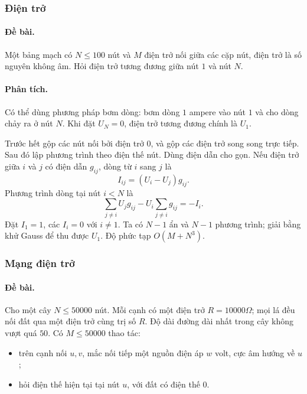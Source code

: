 \documentclass[11pt]{article}
\begin{document}
\subsubsection{Điện trở}

\paragraph{Đề bài.}
Một bảng mạch có \(N\le 100\) nút và \(M\) điện trở nối giữa các cặp nút, điện
trở là số nguyên không âm. Hỏi điện trở tương đương giữa nút \(1\) và nút \(N\).

\paragraph{Phân tích.}
Có thể dùng phương pháp bơm dòng: bơm dòng \(1\) ampere vào nút \(1\) và cho
dòng chảy ra ở nút \(N\). Khi đặt \(U_N=0\), điện trở tương đương chính là
\(U_1\).

Trước hết gộp các nút nối bởi điện trở \(0\), và gộp các điện trở song song
trực tiếp. Sau đó lập phương trình theo điện thế nút. Dùng điện dẫn cho gọn.
Nếu điện trở giữa \(i\) và \(j\) có điện dẫn \(g_{ij}\), dòng từ \(i\) sang
\(j\) là
\[
  I_{ij}=(U_i-U_j)g_{ij}.
\]
Phương trình dòng tại nút \(i<N\) là
\[
  \sum_{j\ne i} U_jg_{ij}-U_i\sum_{j\ne i}g_{ij}=-I_i.
\]
Đặt \(I_1=1\), các \(I_i=0\) với \(i\ne 1\). Ta có \(N-1\) ẩn và \(N-1\)
phương trình; giải bằng khử Gauss để thu được \(U_1\). Độ phức tạp
\(O(M+N^3)\).

\subsubsection{Mạng điện trở}

\paragraph{Đề bài.}
Cho một cây \(N\le 50000\) nút. Mỗi cạnh có một điện trở \(R=10000\Omega\);
mọi lá đều nối đất qua một điện trở cùng trị số \(R\). Độ dài đường dài nhất
trong cây không vượt quá \(50\). Có \(M\le 50000\) thao tác:
\begin{itemize}
  \item trên cạnh nối \(u,v\), mắc nối tiếp một nguồn điện áp \(w\) volt, cực
  âm hướng về \(u\);
  \item hỏi điện thế hiện tại tại nút \(u\), với đất có điện thế \(0\).
\end{itemize}
\end{document}
